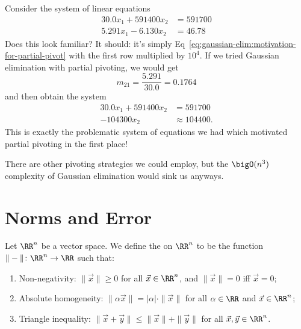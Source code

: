 \begin{example}
Consider the system of linear equations
\begin{subequations}
\begin{align}
30.0x_{1} + 591400 x_{2} &= 591700\\
5.291x_{1} - 6.130 x_{2} &= 46.78
\end{align}
\end{subequations}
Does this look familiar? It should: it's simply Eq~\eqref{eq:gaussian-elim:motivation-for-partial-pivot}
with the first row multiplied by $10^{4}$. If we tried Gaussian
elimination with partial pivoting, we would get
\begin{equation*}
m_{21}=\frac{5.291}{30.0}=0.1764
\end{equation*}
and then obtain the system
\begin{subequations}
\begin{align}
30.0x_{1} + 591400 x_{2} &= 591700\\
-104300 x_{2} &\approx 104400.
\end{align}
\end{subequations}
This is exactly the problematic system of equations we had which
motivated partial pivoting in the first place!
\end{example}

There are other pivoting strategies we could employ, but the
$\bigO(n^{3})$ complexity of Gaussian elimination would sink us
anyways.

\section{Norms and Error}

\begin{definition}
Let $\RR^{n}$ be a vector space. We define the  on
$\RR^{n}$ to be the function $\|-\|\colon\RR^{n}\to\RR$ such that:
\begin{enumerate}
\item Non-negativity: $\|\vec{x}\|\geq0$ for all $\vec{x}\in\RR^{n}$, and
  $\|\vec{x}\|=0$ iff $\vec{x}=0$;
\item Absolute homogeneity: $\|\alpha\vec{x}\|=|\alpha|\cdot\|\vec{x}\|$
  for all $\alpha\in\RR$ and $\vec{x}\in\RR^{n}$;
\item Triangle inequality: $\|\vec{x}+\vec{y}\|\leq\|\vec{x}\|+\|\vec{y}\|$
  for all $\vec{x},\vec{y}\in\RR^{n}$.
\end{enumerate}
\end{definition}

